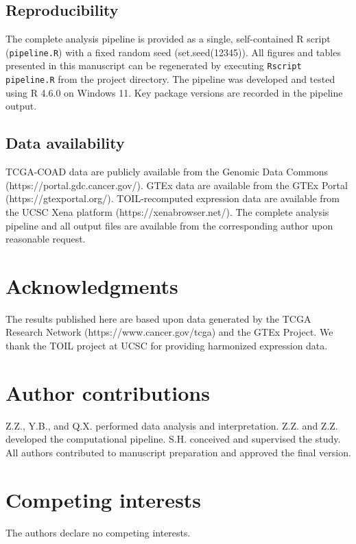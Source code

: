 \documentclass[fleqn,10pt]{wlscirep}
\begin{document}
\subsection*{Reproducibility}

The complete analysis pipeline is provided as a single, self-contained R script (\texttt{pipeline.R}) with a fixed random seed (set.seed(12345)). All figures and tables presented in this manuscript can be regenerated by executing \texttt{Rscript pipeline.R} from the project directory. The pipeline was developed and tested using R 4.6.0 on Windows 11. Key package versions are recorded in the pipeline output.

\subsection*{Data availability}

TCGA-COAD data are publicly available from the Genomic Data Commons (https://portal.gdc.cancer.gov/). GTEx data are available from the GTEx Portal (https://gtexportal.org/). TOIL-recomputed expression data are available from the UCSC Xena platform (https://xenabrowser.net/). The complete analysis pipeline and all output files are available from the corresponding author upon reasonable request.

\section*{Acknowledgments}
The results published here are based upon data generated by the TCGA Research Network (https://www.cancer.gov/tcga) and the GTEx Project. We thank the TOIL project at UCSC for providing harmonized expression data.

\section*{Author contributions}
Z.Z., Y.B., and Q.X. performed data analysis and interpretation. Z.Z. and Z.Z. developed the computational pipeline. S.H. conceived and supervised the study. All authors contributed to manuscript preparation and approved the final version.

\section*{Competing interests}
The authors declare no competing interests.
\end{document}

